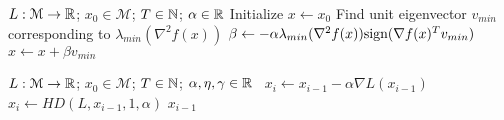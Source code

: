 %
%
\begin{algorithm}[hb]
 \caption{$x = HD(L,x_0, T,\alpha$)}
   \label{HD}
\begin{algorithmic}
    $L: \mathcal{M} \to {\mathbb{R}}$; $x_0 \in \mathcal{M}$; $T\in {\mathbb{N}}$; $\alpha \in {\mathbb{R}}$
   \State Initialize $x \leftarrow x_0$
   \State Find unit eigenvector $v_{min}$ corresponding to $\lambda_{min}(\nabla^2 f(x))$ 
   \State  $\beta \leftarrow -\alpha \lambda_{min}(\nabla^2 f(x)) \text{sign}(\nabla f(x)^Tv_{min}) $
    \State $x \leftarrow x + \beta v_{min}$
   \EndFor
\end{algorithmic}
\end{algorithm}
%
\begin{algorithm}[hb]
 \caption{$x = SecondGD(L, x_0, T,\alpha, \eta, \gamma)$}
   \label{SecondGD}
\begin{algorithmic}
    $L:\mathcal{M} \to {\mathbb{R}}$; $x_0 \in
   \mathcal{M}$; $T\in {\mathbb{N}}$; $\alpha, \eta, \gamma \in {\mathbb{R}}$
   \  $x_{i} \leftarrow
 x_{i-1} - \alpha \nabla L(x_{i-1})$
   \Else \
$x_i \leftarrow HD(L, x_{i-1}, 1, \alpha)$ 
  \EndIf
     \Return $x_{i-1}$
   \EndIf 
   \EndFor
   \end{algorithmic}
%
\end{algorithm}
